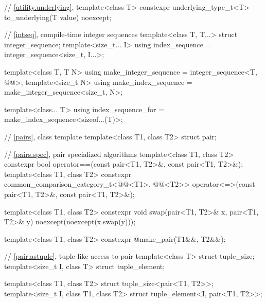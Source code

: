 \begin{codeblock}
{  // \ref{utility.underlying}, 
  template<class T>
    constexpr underlying_type_t<T> to_underlying(T value) noexcept;

  // \ref{intseq}, compile-time integer sequences%
%
%
  template<class T, T...>
    struct integer_sequence;
  template<size_t... I>
    using index_sequence = integer_sequence<size_t, I...>;

  template<class T, T N>
    using make_integer_sequence = integer_sequence<T, @\seebelow{}@>;
  template<size_t N>
    using make_index_sequence = make_integer_sequence<size_t, N>;

  template<class... T>
    using index_sequence_for = make_index_sequence<sizeof...(T)>;

  // \ref{pairs}, class template 
  template<class T1, class T2>
    struct pair;

  // \ref{pairs.spec}, pair specialized algorithms
  template<class T1, class T2>
    constexpr bool operator==(const pair<T1, T2>&, const pair<T1, T2>&);
  template<class T1, class T2>
    constexpr common_comparison_category_t<@@<T1>,
                                           @@<T2>>
      operator<=>(const pair<T1, T2>&, const pair<T1, T2>&);

  template<class T1, class T2>
    constexpr void swap(pair<T1, T2>& x, pair<T1, T2>& y) noexcept(noexcept(x.swap(y)));

  template<class T1, class T2>
    constexpr @\seebelow@ make_pair(T1&&, T2&&);

  // \ref{pair.astuple}, tuple-like access to pair
  template<class T> struct tuple_size;
  template<size_t I, class T> struct tuple_element;

  template<class T1, class T2> struct tuple_size<pair<T1, T2>>;
  template<size_t I, class T1, class T2> struct tuple_element<I, pair<T1, T2>>;

}
\end{codeblock}
